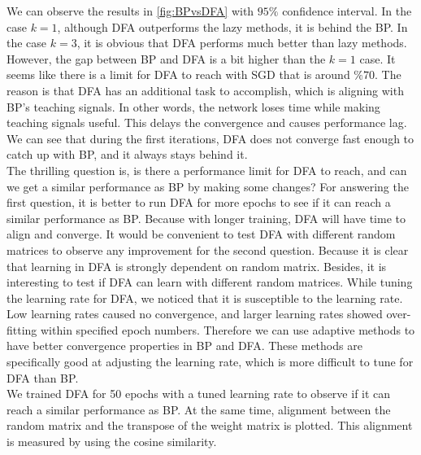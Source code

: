 \documentclass[a4paper, nobind]{templates/ociamthesis}
\begin{document}
\noindent We can observe the results in \ref{fig:BPvsDFA} with \(95\%\) confidence interval. In the case \(k=1\), although DFA outperforms the lazy methods, it is behind the BP. In the case \(k=3\), it is obvious that DFA performs much better than lazy methods. However, the gap between BP and DFA is a bit higher than the \(k=1\) case. It seems like there is a limit for DFA to reach with SGD that is around \(\%70\). The reason is that DFA has an additional task to accomplish, which is aligning with BP's teaching signals. In other words, the network loses time while making teaching signals useful. This delays the convergence and causes performance lag. We can see that during the first iterations, DFA does not converge fast enough to catch up with BP, and it always stays behind it.\\
The thrilling question is, is there a performance limit for DFA to reach, and can we get a similar performance as BP by making some changes? For answering the first question, it is better to run DFA for more epochs to see if it can reach a similar performance as BP. Because with longer training, DFA will have time to align and converge. It would be convenient to test DFA with different random matrices to observe any improvement for the second question. Because it is clear that learning in DFA is strongly dependent on random matrix. Besides, it is interesting to test if DFA can learn with different random matrices. While tuning the learning rate for DFA, we noticed that it is susceptible to the learning rate. Low learning rates caused no convergence, and larger learning rates showed over-fitting within specified epoch numbers. Therefore we can use adaptive methods to have better convergence properties in BP and DFA. These methods are specifically good at adjusting the learning rate, which is more difficult to tune for DFA than BP.\\
\noindent We trained DFA for 50 epochs with a tuned learning rate to observe if it can reach a similar performance as BP. At the same time, alignment between the random matrix and the transpose of the weight matrix is plotted. This alignment is measured by using the cosine similarity.
\end{document}
